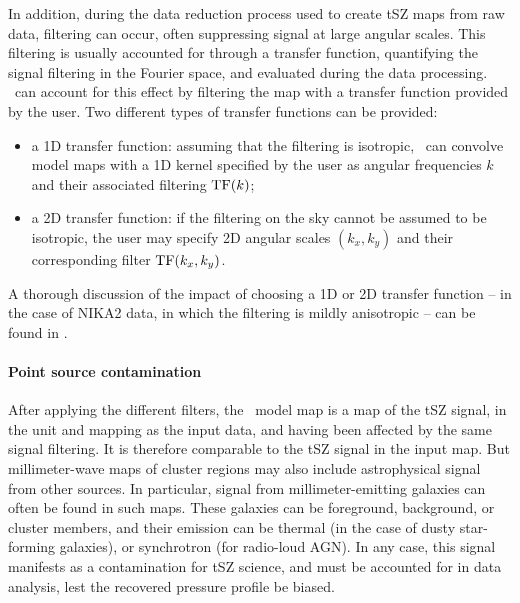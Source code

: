In addition, during the data reduction process used to create tSZ maps from raw data, filtering can occur, often suppressing signal at large angular scales.
This filtering is usually accounted for through a transfer function, quantifying the signal filtering in the Fourier space, and evaluated during the data processing.
\panco\ can account for this effect by filtering the map with a transfer function provided by the user.
Two different types of transfer functions can be provided: 
\begin{itemize}[leftmargin=*]
    \item a 1D transfer function: assuming that the filtering is isotropic, \panco\ can convolve model maps with a 1D kernel specified by the user as angular frequencies $k$ and their associated filtering ${\rm TF}(k)$;
    \item a 2D transfer function: if the filtering on the sky cannot be assumed to be isotropic, the user may specify 2D angular scales $(k_x, k_y)$ and their corresponding filter ${\rm TF}(k_x, k_y)$.
\end{itemize}
A thorough discussion of the impact of choosing a 1D or 2D transfer function -- in the case of NIKA2 data, in which the filtering is mildly anisotropic -- can be found in \citet{munoz-echeverria_multi-probe_2022}.

\paragraph{Point source contamination}

After applying the different filters, the \panco\ model map is a map of the tSZ signal, in the unit and mapping as the input data, and having been affected by the same signal filtering.
It is therefore comparable to the tSZ signal in the input map.
But millimeter-wave maps of cluster regions may also include astrophysical signal from other sources.
In particular, signal from millimeter-emitting galaxies can often be found in such maps.
These galaxies can be foreground, background, or cluster members, and their emission can be thermal (in the case of dusty star-forming galaxies), or synchrotron (for radio-loud AGN).
In any case, this signal manifests as a contamination for tSZ science, and must be accounted for in data analysis, lest the recovered pressure profile be biased.

